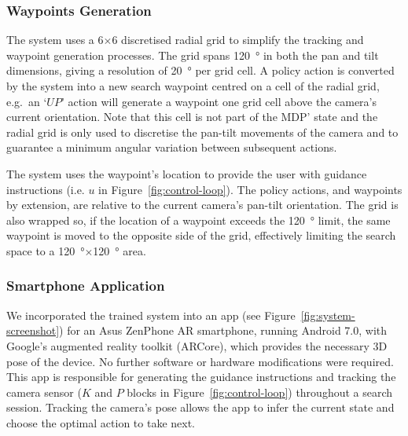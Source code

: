 \documentclass[a4paper, twoside]{article}
\begin{document}
\subsubsection{Waypoints Generation}\label{sec:waypoints-generation}

The system uses a 6$\times$6 discretised radial grid to simplify the tracking and waypoint generation processes. The grid spans \SI{120}{\degree} in both the pan and tilt dimensions, giving a resolution of \SI{20}{\degree} per grid cell. A policy action is converted by the system into a new search waypoint centred on a cell of the radial grid, e.g.\ an `$UP$' action will generate a waypoint one grid cell above the camera's current orientation. Note that this cell is not part of the MDP' state and the radial grid is only used to discretise the pan-tilt movements of the camera and to guarantee a minimum angular variation between subsequent actions.

The system uses the waypoint's location to provide the user with guidance instructions (i.e. $u$ in Figure~\ref{fig:control-loop}). The policy actions, and waypoints by extension, are relative to the current camera's pan-tilt orientation. The grid is also wrapped so, if the location of a waypoint exceeds the \SI{120}{\degree} limit, the same waypoint is moved to the opposite side of the grid, effectively limiting the search space to a \SI{120}{\degree}$\times$\SI{120}{\degree} area. 

\subsubsection{Smartphone Application}\label{sec:smartphone-application}

We incorporated the trained system into an app (see Figure~\ref{fig:system-screenshot}) for an Asus ZenPhone AR smartphone, running Android 7.0, with Google's augmented reality toolkit (ARCore), which provides the necessary 3D pose of the device. No further software or hardware modifications were required. This app is responsible for generating the guidance instructions and tracking the camera sensor ($K$ and $P$ blocks in Figure~\ref{fig:control-loop}) throughout a search session. Tracking the camera's pose allows the app to infer the current state and choose the optimal action to take next. 
\end{document}
